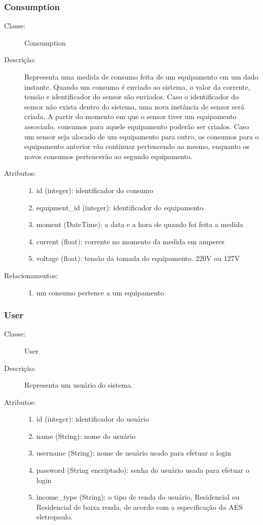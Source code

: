 \subsubsection{Consumption}
\begin{description}
	\item[Classe:] Consumption
	\item[Descrição:] Representa uma medida de consumo feita de um equipamento em um dado instante. Quando um consumo é enviado ao sistema, o valor da corrente, tensão e identificador do sensor são enviados. Caso o identificador do sensor não exista dentro do sistema, uma nova instância de sensor será criada. A partir do momento em que o sensor tiver um equipamento associado, consumos para aquele equipamento poderão ser criados. Caso um sensor seja alocado de um equipamento para outro, os consumos para o equipamento anterior vão continuar pertencendo ao mesmo, enquanto os novos consumos pertencerão ao segundo equipamento.
	\item[Atributos:] \hfill
		\begin{enumerate}
			\item id (integer): identificador do consumo
			\item equipment\_id (integer): identificador do equipamento
			\item moment (DateTime): a data e a hora de quando foi feita a medida
			\item current (float): corrente no momento da medida em amperes
			\item voltage (float): tensão da tomada do equipamento. 220V ou 127V
		\end{enumerate}
	\item[Relacionamentos:] \hfill
		\begin{enumerate}
			\item um consumo pertence a um equipamento
		\end{enumerate}
\end{description} 
%
\subsubsection{User}
\begin{description}
	\item[Classe:] User
	\item[Descrição:] Representa um usuário do sistema. 
	\item[Atributos:] \hfill
		\begin{enumerate}
			\item id (integer): identificador do usuário
			\item name (String):  nome do usuário
			\item username (String): nome de usuário usado para efetuar o login
			\item password (String encriptado): senha do usuário usada para efetuar o login
		    \item income\_type (String): o tipo de renda do usuário, Residencial ou Residencial de baixa renda, de acordo com a especificação da AES eletropaulo.
		\end{enumerate}
\end{description} 
%
